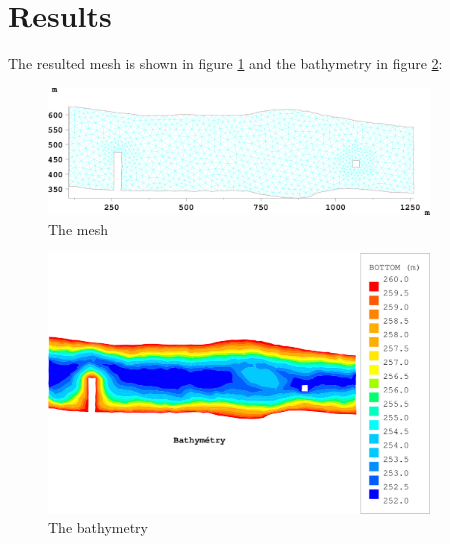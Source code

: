 \section{Results}
The resulted mesh is shown in figure \ref{fig:trigridmailtot:mesh} and the
bathymetry in figure \ref{fig:trigridmailtot:bathy}:
\begin{figure}[H]%
\begin{center}
%
  \includegraphics[width=0.9\textwidth]{mesh}
%
\end{center}
\caption
{The mesh}
\label{fig:trigridmailtot:mesh}
\end{figure}
%
\begin{figure}[H]%
\begin{center}
%
  \includegraphics[width=0.9\textwidth]{bathy}
%
\end{center}
\caption
{The bathymetry}
\label{fig:trigridmailtot:bathy}
\end{figure}
%
